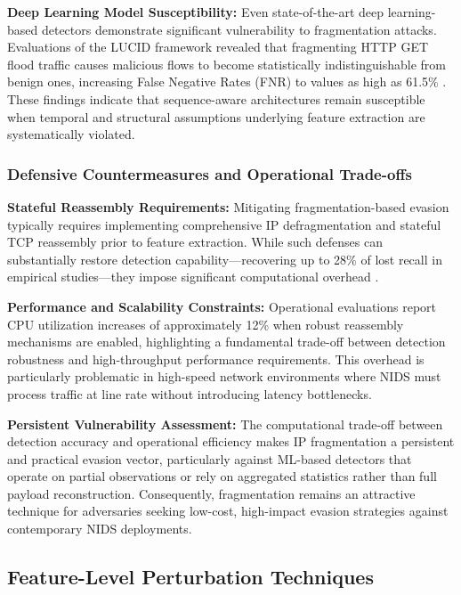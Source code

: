 \textbf{Deep Learning Model Susceptibility:}
Even state-of-the-art deep learning-based detectors demonstrate significant vulnerability to fragmentation attacks. Evaluations of the LUCID framework revealed that fragmenting HTTP GET flood traffic causes malicious flows to become statistically indistinguishable from benign ones, increasing False Negative Rates (FNR) to values as high as 61.5\% \cite{abdelaty2021gadot}. These findings indicate that sequence-aware architectures remain susceptible when temporal and structural assumptions underlying feature extraction are systematically violated.

\subsubsection{Defensive Countermeasures and Operational Trade-offs}

\textbf{Stateful Reassembly Requirements:}
Mitigating fragmentation-based evasion typically requires implementing comprehensive IP defragmentation and stateful TCP reassembly prior to feature extraction. While such defenses can substantially restore detection capability—recovering up to 28\% of lost recall in empirical studies—they impose significant computational overhead \cite{md2025guardians}.

\textbf{Performance and Scalability Constraints:}
Operational evaluations report CPU utilization increases of approximately 12\% when robust reassembly mechanisms are enabled, highlighting a fundamental trade-off between detection robustness and high-throughput performance requirements. This overhead is particularly problematic in high-speed network environments where NIDS must process traffic at line rate without introducing latency bottlenecks.

\textbf{Persistent Vulnerability Assessment:}
The computational trade-off between detection accuracy and operational efficiency makes IP fragmentation a persistent and practical evasion vector, particularly against ML-based detectors that operate on partial observations or rely on aggregated statistics rather than full payload reconstruction. Consequently, fragmentation remains an attractive technique for adversaries seeking low-cost, high-impact evasion strategies against contemporary NIDS deployments.

\subsection{Feature-Level Perturbation Techniques}


